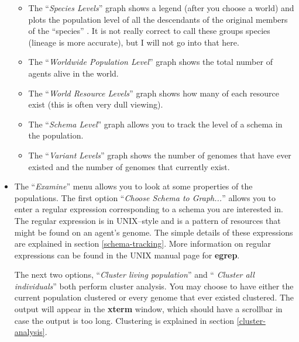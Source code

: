 \begin{itemize}
\begin{itemize}
\item
The ``{\sl Species Levels}''  graph shows
a legend (after you choose a world) and plots the population level of
all the descendants of the original members of the ``species''
. It is not really correct to call these groups species
(lineage is more accurate), but I will not go into that here.

\item
The ``{\sl Worldwide Population Level}''  graph shows the total number of agents alive in the world.

\item
The ``{\sl World Resource Levels}'' 
graph shows how many of each resource exist (this is often very dull
viewing).

\item
The ``{\sl Schema Level}''  graph allows you
to track the level of a schema in the population.

\item
The ``{\sl Variant Levels}''  graph shows
the number of genomes that have ever existed and the number of genomes
that currently exist.

\end{itemize}

\item
The ``{\sl Examine}''  menu allows you to look at
some properties of the populations. The first option ``{\sl Choose
Schema to Graph...}''    allows you to enter a regular expression
corresponding to a schema you are interested in. The regular
expression is in UNIX--style and is a pattern of resources that might
be found on an agent's genome.  The simple details of these
expressions are explained in section
\ref{schema-tracking}.  More information on regular expressions can be
found in the UNIX manual page for {\bf egrep}.

The next two options, ``{\sl Cluster living population}'' and ``{\sl
Cluster all individuals}''  both perform
cluster analysis. You may choose to have either the current population
clustered or every genome that ever existed clustered. The output will
appear in the {\bf xterm} window, which should have a scrollbar in
case the output is too long. Clustering is explained in section
\ref{cluster-analysis}.

\end{itemize}

